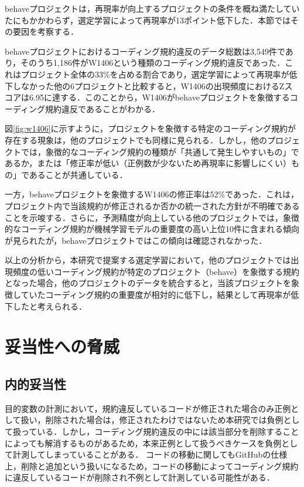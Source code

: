 \documentclass[paper]{ieicej}
\begin{document}
behaveプロジェクトは，再現率が向上するプロジェクトの条件を概ね満たしていたにもかかわらず，選定学習によって再現率が13ポイント低下した．本節ではその要因を考察する．

behaveプロジェクトにおけるコーディング規約違反のデータ総数は3,549件であり，そのうち1,186件がW1406という種類のコーディング規約違反であった．これはプロジェクト全体の33\%を占める割合であり，選定学習によって再現率が低下しなかった他の6プロジェクトと比較すると，W1406の出現頻度におけるZスコアは6.95に達する．このことから，W1406がbehaveプロジェクトを象徴するコーディング規約違反であることがわかる．

図\ref{fig:w1406}に示すように，プロジェクトを象徴する特定のコーディング規約が存在する現象は，他のプロジェクトでも同様に見られる．しかし，他のプロジェクトでは，象徴的なコーディング規約の種類が「共通して発生しやすいもの」であるか，または「修正率が低い（正例数が少ないため再現率に影響しにくい）もの」であることが共通している．

一方，behaveプロジェクトを象徴するW1406の修正率は52\%であった．これは，プロジェクト内で当該規約が修正されるか否かの統一された方針が不明確であることを示唆する．さらに，予測精度が向上している他のプロジェクトでは，象徴的なコーディング規約が機械学習モデルの重要度の高い上位10件に含まれる傾向が見られたが，behaveプロジェクトではこの傾向は確認されなかった．

以上の分析から，本研究で提案する選定学習において，他のプロジェクトでは出現頻度の低いコーディング規約が特定のプロジェクト（behave）を象徴する規約となった場合，他のプロジェクトのデータを統合すると，当該プロジェクトを象徴していたコーディング規約の重要度が相対的に低下し，結果として再現率が低下したと考えられる．

\section{妥当性への脅威}\label{chap:heuristic}
\subsection{内的妥当性}


目的変数の計測において，規約違反しているコードが修正された場合のみ正例として扱い，削除された場合は，修正されたわけではないため本研究では負例として扱っている．しかし，コーディング規約違反の中には該当部分を削除することによっても解消するものがあるため，本来正例として扱うべきケースを負例として計測してしまっていることがある．
コードの移動に関してもGitHubの仕様上，削除と追加という扱いになるため，コードの移動によってコーディング規約に違反しているコードが削除され不例として計測している可能性がある．
\end{document}
